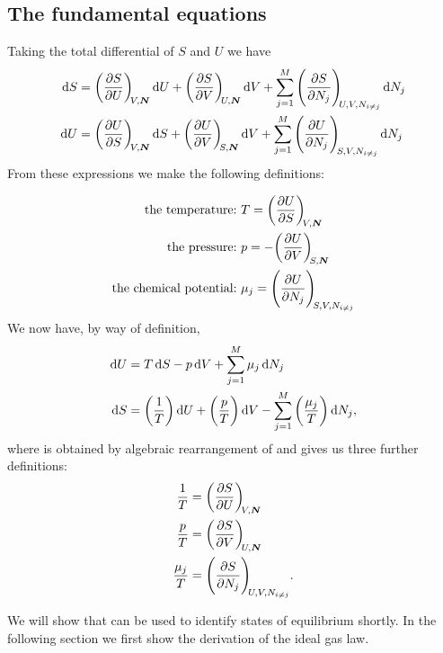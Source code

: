 \subsection{The fundamental equations}
Taking the total differential of $S$ and $U$ we have
\begin{subequations}
\begin{align}
\dif S&=\diffp SU[V,\boldsymbol{N}]\dif U+\diffp SV[U,\boldsymbol{N}]\dif V+\sum_{j=1}^M\diffp {S}{N_j}[U,V,N_{i\neq j}]\dif N_j \label{fund_a}\\
\dif U&=\diffp US[V,\boldsymbol{N}]\dif S+\diffp UV[S,\boldsymbol{N}]\dif V+\sum_{j=1}^M\diffp {U}{N_j}[S,V,N_{i\neq j}]\dif N_j \label{fund_b}
\end{align}
\end{subequations}
From these expressions we make the following definitions: 
\begin{defi}
\begin{subequations}
\begin{align}
\text{the temperature:\ }&T=\diffp US[V,\boldsymbol{N}] \label{diff_t}\\
\text{the pressure:\ }&p=-\diffp UV[S,\boldsymbol{N}] \label{diff_p}\\
\text{the chemical potential:\ }&\mu_j=\diffp {U}{N_j}[S,V,N_{i\neq j}]\label{diff_mu}
\end{align}
\end{subequations}
We now have, by way of definition, 
\begin{subequations}
\begin{align}
\dif U&=T\dif S-p\dif V+\sum_{j=1}^M\mu_j\dif N_j \label{diff_a}\\
\dif S&=\left(\frac{1}{T}\right)\dif U+\left(\frac{p}{T}\right)\dif V-\sum_{j=1}^M\left(\frac{\mu_j}{T}\right)\dif N_j \label{diff_b}, 
\end{align}
\end{subequations}
where  is obtained by algebraic rearrangement of  and gives us three further definitions: 
\begin{subequations}
\begin{align}
\frac{1}{T}&=\diffp SU[V,\boldsymbol{N}] \label{sdiffa}\\
\frac{p}{T}&=\diffp SV[U,\boldsymbol{N}] \label{sdiffb}\\
\frac{\mu_j}{T}&=\diffp{S}{N_j}[U,V,N_{i\neq j}]. \label{sdiffc}
\end{align}
\end{subequations}
\end{defi}
We will show that  can be used to identify states of equilibrium shortly. In the following section we first show the derivation of the ideal gas law. 

